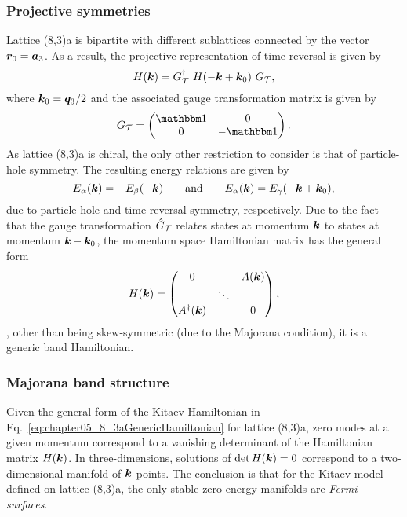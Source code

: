 %
%
\subsubsection{Projective symmetries}
%
%
Lattice (8,3)a is bipartite with different sublattices connected by the vector $\bm{r}_0 = \bm{a}_3$.
As a result, the projective representation of time-reversal is given by
%
\begin{equation}
	H(\bm{k}) = G^{\dagger}_{\mathcal{T}}~H(-\bm{k} + \bm{k}_0)~G_{\mathcal{T}},
\end{equation}
%
where $\bm{k}_0 = \bm{q}_3/2$ and the associated gauge transformation matrix is given by
%
\begin{equation}
	G_{\mathcal{T}} =
		\begin{pmatrix}
			\id & 0 \\
			0	& -\id
		\end{pmatrix}.
\end{equation}
%
As lattice (8,3)a is chiral, the only other restriction to consider is that of particle-hole symmetry.
The resulting energy relations are given by\pagebreak
%
\begin{equation}
	E_{\alpha}(\bm{k}) = -E_{\beta}(-\bm{k}) \qquad {\rm and } \qquad E_{\alpha}(\bm{k}) = E_{\gamma}(-\bm{k} + \bm{k}_0),
\end{equation}
%
due to particle-hole and time-reversal symmetry, respectively.
Due to the fact that the gauge transformation $\hat{G}_{\mathcal{T}}$ relates states at momentum $\bm{k}$ to states at momentum $\bm{k} - \bm{k}_0$, the momentum space Hamiltonian matrix has the general form
%
\begin{equation}
	H(\bm{k}) = 
		\begin{pmatrix}
			0			&			& A(\bm{k}) 	\\
						& \ddots 	& 			\\
			A^{\dagger}(\bm{k})	&			& 0
		\end{pmatrix},
	\label{eq:chapter05_8_3aGenericHamiltonian}
\end{equation}
%
\ie, other than being skew-symmetric (due to the Majorana condition), it is a generic band Hamiltonian.


%
%
\subsubsection{Majorana band structure}
%
%
Given the general form of the Kitaev Hamiltonian in Eq.~\eqref{eq:chapter05_8_3aGenericHamiltonian} for lattice (8,3)a, zero modes at a given momentum correspond to a vanishing determinant of the Hamiltonian matrix $H(\bm{k})$.
In three-dimensions, solutions of $\det{H(\bm{k})} = 0$ correspond to a two-dimensional manifold of $\bm{k}$-points.
The conclusion is that for the Kitaev model defined on lattice (8,3)a, the only stable zero-energy manifolds are \textit{Fermi surfaces}.

